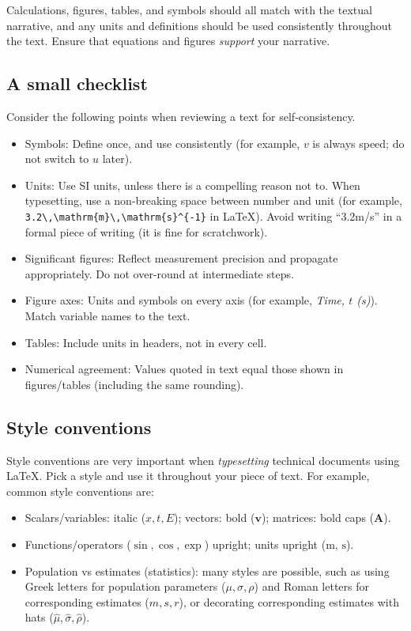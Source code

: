 \documentclass[
  a4paper,
  DIV=11,
  numbers=noendperiod,
  oneside]{scrreprt}
\providecommand{\tightlist}{%
  \setlength{\itemsep}{0pt}\setlength{\parskip}{0pt}}
\begin{document}
Calculations, figures, tables, and symbols should all match with the
textual narrative, and any units and definitions should be used
consistently throughout the text. Ensure that equations and figures
\emph{support} your narrative.

\subsection{A small checklist}\label{a-small-checklist}

Consider the following points when reviewing a text for
self-consistency.

\begin{itemize}
\tightlist
\item
  Symbols: Define once, and use consistently (for example, \(v\) is
  always speed; do not switch to \(u\) later).
\item
  Units: Use SI units, unless there is a compelling reason not to. When
  typesetting, use a non-breaking space between number and unit (for
  example,
  \texttt{3.2\textbackslash{},\textbackslash{}mathrm\{m\}\textbackslash{},\textbackslash{}mathrm\{s\}\^{}\{-1\}}
  in LaTeX). Avoid writing ``3.2m/s'' in a formal piece of writing (it
  is fine for scratchwork).
\item
  Significant figures: Reflect measurement precision and propagate
  appropriately. Do not over-round at intermediate steps.
\item
  Figure axes: Units and symbols on every axis (for example, \emph{Time,
  \(t\) (s)}). Match variable names to the text.
\item
  Tables: Include units in headers, not in every cell.
\item
  Numerical agreement: Values quoted in text equal those shown in
  figures/tables (including the same rounding).
\end{itemize}

\subsection{Style conventions}\label{style-conventions}

Style conventions are very important when \emph{typesetting} technical
documents using LaTeX. Pick a style and use it throughout your piece of
text. For example, common style conventions are:

\begin{itemize}
\tightlist
\item
  Scalars/variables: italic (\(x, t, E\)); vectors: bold
  (\(\mathbf{v}\)); matrices: bold caps (\(\mathbf{A}\)).
\item
  Functions/operators (\(\sin, \cos, \exp\)) upright; units upright
  (\(\mathrm{m},\,\mathrm{s}\)).
\item
  Population vs estimates (statistics): many styles are possible, such
  as using Greek letters for population parameters
  (\(\mu, \sigma, \rho\)) and Roman letters for corresponding estimates
  (\(m, s, r\)), or decorating corresponding estimates with hats
  (\(\hat{\mu}, \hat{\sigma}, \hat{\rho}\)).
\end{itemize}
\end{document}
